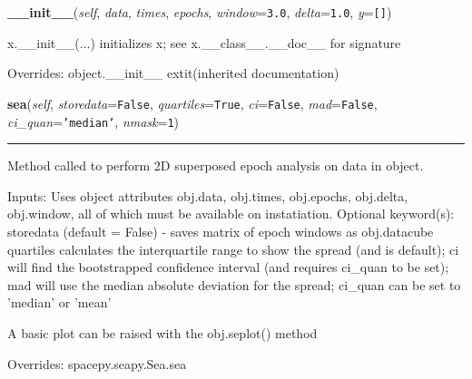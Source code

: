 \hspace{.8\funcindent}\begin{boxedminipage}{\funcwidth}

    \raggedright \textbf{\_\_init\_\_}(\textit{self}, \textit{data}, \textit{times}, \textit{epochs}, \textit{window}={\tt 3.0}, \textit{delta}={\tt 1.0}, \textit{y}={\tt \texttt{[}\texttt{]}})

\setlength{\parskip}{2ex}
    x.\_\_init\_\_(...) initializes x; see x.\_\_class\_\_.\_\_doc\_\_ for 
    signature

\setlength{\parskip}{1ex}
      Overrides: object.\_\_init\_\_ 	extit{(inherited documentation)}

    \end{boxedminipage}

    \vspace{0.5ex}

\hspace{.8\funcindent}\begin{boxedminipage}{\funcwidth}

    \raggedright \textbf{sea}(\textit{self}, \textit{storedata}={\tt False}, \textit{quartiles}={\tt True}, \textit{ci}={\tt False}, \textit{mad}={\tt False}, \textit{ci\_quan}={\tt \texttt{'}\texttt{median}\texttt{'}}, \textit{nmask}={\tt 1})

    \vspace{-1.5ex}

    \rule{\textwidth}{0.5\fboxrule}
\setlength{\parskip}{2ex}
    Method called to perform 2D superposed epoch analysis on data in 
    object.

    Inputs: Uses object attributes obj.data, obj.times, obj.epochs, 
    obj.delta, obj.window, all of which must be available on instatiation. 
    Optional keyword(s): storedata (default = False) - saves matrix of 
    epoch windows as obj.datacube quartiles calculates the interquartile 
    range to show the spread (and is default); ci will find the 
    bootstrapped confidence interval (and requires ci\_quan to be set); mad
    will use the median absolute deviation for the spread; ci\_quan can be 
    set to 'median' or 'mean'

    A basic plot can be raised with the obj.seplot() method

\setlength{\parskip}{1ex}
      Overrides: spacepy.seapy.Sea.sea

    \end{boxedminipage}

    \vspace{0.5ex}

